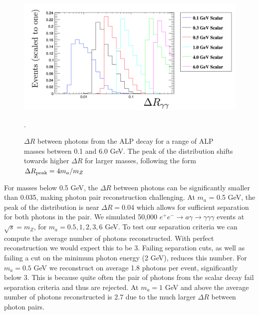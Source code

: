 \documentclass[aps,onecolumn,twoside,secnumarabic,12pt,balancelastpage,amsmath,amssymb,nofootinbib,hyperref=pdftex]{revtex4}
\begin{document}
\begin{figure}[htbp]
\begin{center}
\includegraphics[width=14cm]{deltaRzdecay.png}
\caption{$\Delta R$ between photons from the ALP decay for a range of ALP masses between 0.1 and 6.0 GeV. The peak of the distribution shifts towards higher $\Delta R$ for larger masses, following the form $\Delta R_{\rm{peak}} = 4m_{a}/m_{Z}$}.
\label{fig:deltaRzdecay}
\end{center}
\end{figure}
For masses below 0.5 GeV, the $\Delta R$ between photons can be significantly smaller than 0.035, making photon pair reconstruction challenging. At $m_{a}$ = 0.5 GeV, the peak of the distribution is near $\Delta R = 0.04$ which allows for sufficient separation for both photons in the pair. We simulated 50,000 $e^{+} e^{-} \rightarrow a \gamma \rightarrow \gamma\gamma\gamma$ events at $\sqrt{s} = m_{Z}$, for $m_{a} = {0.5, 1, 2, 3, 6}$ GeV. To test our separation criteria we can compute the average number of photons reconstructed. With perfect reconstruction we would expect this to be 3. Failing separation cuts, as well as failing a cut on the minimum photon energy (2 GeV), reduces this number. For $m_{a} = 0.5$ GeV we reconstruct on average 1.8 photons per event, significantly below 3. This is because quite often the pair of photons from the scalar decay fail separation criteria and thus are rejected. At $m_{a} = 1$ GeV and above the average number of photons reconstructed is 2.7 due to the much larger $\Delta R$ between photon pairs.
\end{document}
